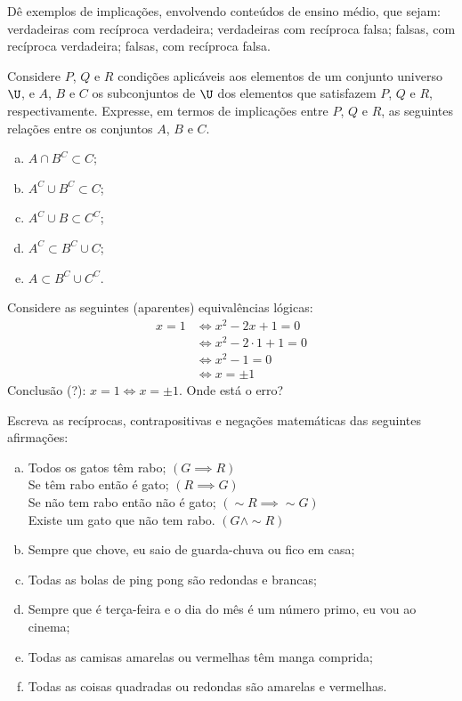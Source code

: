 \begin{exercise}
Dê exemplos de implicações, envolvendo conteúdos de ensino
  médio, que sejam: verdadeiras com recíproca verdadeira;
  verdadeiras com recíproca falsa; falsas, com recíproca verdadeira;
  falsas, com recíproca falsa.
\end{exercise}

\begin{exercise}
Considere $P$, $Q$ e $R$ condições aplicáveis aos elementos
de um conjunto universo $\U$, e $A$, $B$ e $C$ os subconjuntos de
$\U$ dos elementos que satisfazem $P$, $Q$ e $R$, respectivamente.
Expresse, em termos de implicações entre $P$, $Q$ e $R$, as
seguintes relações entre os conjuntos $A$, $B$ e $C$.
\begin{enumerate}[a.]
\item $A \cap B^C \subset C$;
\item $A^C \cup B^C \subset C$;
\item $A^C \cup B \subset C^C$;
\item $A^C \subset B^C \cup C$;
\item $A \subset B^C \cup C^C$.
\end{enumerate}
\end{exercise}

\begin{exercise}
Considere as seguintes (aparentes) equivalências lógicas:
\begin{align*}
x=1 & \iff x^2 -2x +1 = 0 \\
& \iff x^2 -2 \cdot 1 +1 =0 \\
& \iff x^2 - 1 =0 \\
& \iff x = \pm 1
\end{align*}
Conclusão (?): $x=1 \iff x= \pm 1$. Onde está o erro?
\end{exercise}

\begin{exercise}
\label{exe:escrever-reciprocas}
Escreva as recíprocas, contrapositivas e negações
matemáticas das seguintes afirmações:
\begin{enumerate}[a.]
  \item Todos os gatos têm rabo; $\left(G \implies R \right)$\\
   Se têm rabo então é gato; $\left(R \implies G \right)$\\
   Se não tem rabo então não é gato; $\left(\sim R \implies \sim G \right)$\\
   Existe um gato que não tem rabo. $\left(G \land \sim R \right)$
  \item Sempre que chove, eu saio de guarda-chuva ou fico em casa;
  \item Todas as bolas de ping pong são redondas e brancas;
  \item Sempre que é terça-feira e o dia do mês é um número primo,
  eu vou ao cinema;
  \item Todas as camisas amarelas ou vermelhas têm manga comprida;
  \item Todas as coisas quadradas ou redondas são amarelas e
  vermelhas.
\end{enumerate}
\end{exercise}

